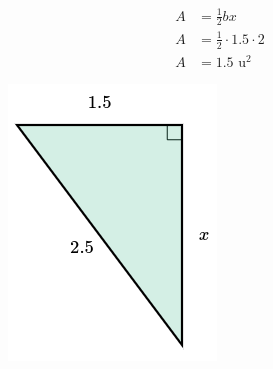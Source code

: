 \begin{solutionbox}{14cm}
\begin{minipage}{0.6\textwidth}
        \begin{align*}
            A & =\frac{1}{2}bx               \\
            A & =\frac{1}{2}\cdot 1.5\cdot 2 \\
            A & =1.5 \text{ u}^2
        \end{align*}
    \end{minipage}\hfill
    \begin{minipage}{0.35\textwidth}
        \begin{figure}[H]
            \centering
            \includegraphics[width=0.5\linewidth]{../images/area_rectangulo_01a.png}
            \caption{}
            \label{fig:area_rectangulo_01a}
        \end{figure}
    \end{minipage}

\end{solutionbox}

